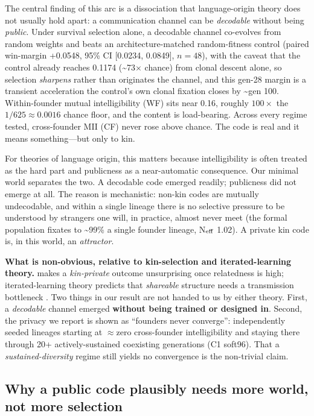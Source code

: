 \documentclass[12pt,letterpaper]{article}
\begin{document}
The central finding of this arc is a dissociation that language-origin theory does not
usually hold apart: a communication channel can be \emph{decodable} without being
\emph{public}. Under survival selection alone, a decodable channel co-evolves from random
weights and beats an architecture-matched random-fitness control (paired win-margin +0.0548,
95\% CI [0.0234, 0.0849], $n{=}48$), with the caveat that the control already reaches 0.1174
(\textasciitilde{}73$\times$ chance) from clonal descent alone, so selection \emph{sharpens}
rather than originates the channel, and this gen-28 margin is a transient acceleration the
control's own clonal fixation closes by \textasciitilde{}gen 100. Within-founder mutual
intelligibility (WF) sits near 0.16, roughly $100\times$ the $1/625 \approx 0.0016$ chance
floor, and the content is load-bearing. Across every regime tested, cross-founder MII (CF)
never rose above chance. The code is real and it means something---but only to kin.

For theories of language origin, this matters because intelligibility is often treated as the
hard part and publicness as a near-automatic consequence. Our minimal world separates the
two. A decodable code emerged readily; publicness did not emerge at all. The reason is
mechanistic: non-kin codes are mutually undecodable, and within a single lineage there is no
selective pressure to be understood by strangers one will, in practice, almost never meet
(the formal population fixates to \textasciitilde{}99\% a single founder lineage,
N$_{\rm eff}$ 1.02). A private kin code is, in this world, an \emph{attractor}.

\textbf{What is non-obvious, relative to kin-selection and iterated-learning theory.}
\citet{hamilton1964} makes a \emph{kin-private} outcome unsurprising once relatedness is
high; iterated-learning theory predicts that \emph{shareable} structure needs a transmission
bottleneck \citep{kirby2008}. Two things in our result are not handed to us by either theory.
First, a \emph{decodable} channel emerged \textbf{without being trained or designed in}.
Second, the privacy we report is shown as ``founders never converge'': independently seeded
lineages starting at $\approx$zero cross-founder intelligibility and staying there through
20+ actively-sustained coexisting generations (C1 soft96). That a \emph{sustained-diversity}
regime still yields no convergence is the non-trivial claim.

\subsection{Why a public code plausibly needs more world, not more selection}
\end{document}
